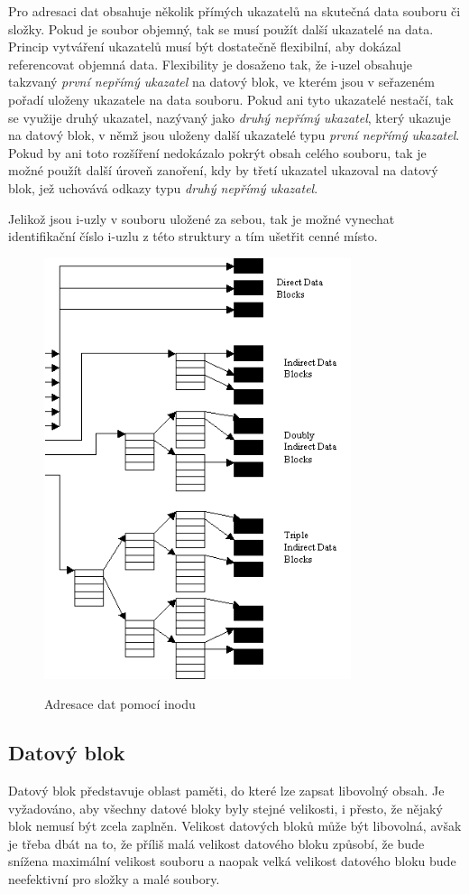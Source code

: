 \documentclass[12pt, a4paper]{article}
\begin{document}
    Pro adresaci dat obsahuje několik přímých ukazatelů na skutečná data souboru či složky. Pokud je soubor objemný, tak se musí použít další ukazatelé na data. Princip vytváření ukazatelů musí být dostatečně flexibilní, aby dokázal referencovat objemná data. Flexibility je dosaženo tak, že i-uzel obsahuje takzvaný \textit{první nepřímý ukazatel} na datový blok, ve kterém jsou v seřazeném pořadí uloženy ukazatele na data souboru. Pokud ani tyto ukazatelé nestačí, tak se využije druhý ukazatel, nazývaný jako \textit{druhý nepřímý ukazatel}, který ukazuje na datový blok, v němž jsou uloženy další ukazatelé typu \textit{první nepřímý ukazatel}. Pokud by ani toto rozšíření nedokázalo pokrýt obsah celého souboru, tak je možné použít další úroveň zanoření, kdy by třetí ukazatel ukazoval na datový blok, jež uchovává odkazy typu \textit{druhý nepřímý ukazatel}.
    
    Jelikož jsou i-uzly v souboru uložené za sebou, tak je možné vynechat identifikační číslo i-uzlu z této struktury a tím ušetřit cenné místo.  
      
\begin{figure}[!ht]
\centering
{\includegraphics[width=9cm]{img/inodes.png}}
\caption{Adresace dat pomocí inodu}
\label{fig:inodes}
\end{figure}
    
    \newpage
    \subsection{Datový blok}
Datový blok představuje oblast paměti, do které lze zapsat libovolný obsah. Je vyžadováno, aby všechny datové bloky byly stejné velikosti, i přesto, že nějaký blok nemusí být zcela zaplněn. Velikost datových bloků může být libovolná, avšak je třeba dbát na to, že příliš malá velikost datového bloku způsobí, že bude snížena maximální velikost souboru a naopak velká velikost datového bloku bude neefektivní pro složky a malé soubory.
\end{document}
